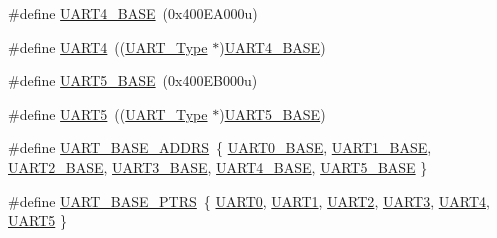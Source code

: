 \begin{DoxyCompactItemize}
\item 
\#define \mbox{\hyperlink{group___u_a_r_t___register___masks_ga94d92270bf587ccdc3a37a5bb5d20467}{U\+A\+R\+T4\+\_\+\+B\+A\+SE}}~(0x400\+E\+A000u)
\item 
\#define \mbox{\hyperlink{group___u_a_r_t___register___masks_ga7c035f6f443c999fc043b2b7fb598800}{U\+A\+R\+T4}}~((\mbox{\hyperlink{struct_u_a_r_t___type}{U\+A\+R\+T\+\_\+\+Type}} $\ast$)\mbox{\hyperlink{group___u_a_r_t___register___masks_ga94d92270bf587ccdc3a37a5bb5d20467}{U\+A\+R\+T4\+\_\+\+B\+A\+SE}})
\item 
\#define \mbox{\hyperlink{group___u_a_r_t___register___masks_gaa155689c0e206e6994951dc3cf31052a}{U\+A\+R\+T5\+\_\+\+B\+A\+SE}}~(0x400\+E\+B000u)
\item 
\#define \mbox{\hyperlink{group___u_a_r_t___register___masks_ga9274e37cf5e8a174fc5dd627b98ec0fe}{U\+A\+R\+T5}}~((\mbox{\hyperlink{struct_u_a_r_t___type}{U\+A\+R\+T\+\_\+\+Type}} $\ast$)\mbox{\hyperlink{group___u_a_r_t___register___masks_gaa155689c0e206e6994951dc3cf31052a}{U\+A\+R\+T5\+\_\+\+B\+A\+SE}})
\item 
\#define \mbox{\hyperlink{group___u_a_r_t___register___masks_gacc6561447356c229be264fa294e6cb79}{U\+A\+R\+T\+\_\+\+B\+A\+S\+E\+\_\+\+A\+D\+D\+RS}}~\{ \mbox{\hyperlink{group___u_a_r_t___register___masks_ga7a07348b4332ff6b88abf6092347deba}{U\+A\+R\+T0\+\_\+\+B\+A\+SE}}, \mbox{\hyperlink{group___u_a_r_t___register___masks_ga383bf0c4670c3a7fa72df80f66331a46}{U\+A\+R\+T1\+\_\+\+B\+A\+SE}}, \mbox{\hyperlink{group___u_a_r_t___register___masks_gac9998d643534960b684d45a60b998421}{U\+A\+R\+T2\+\_\+\+B\+A\+SE}}, \mbox{\hyperlink{group___u_a_r_t___register___masks_ga2eff3896840fdf741bd67d2d7fe99a34}{U\+A\+R\+T3\+\_\+\+B\+A\+SE}}, \mbox{\hyperlink{group___u_a_r_t___register___masks_ga94d92270bf587ccdc3a37a5bb5d20467}{U\+A\+R\+T4\+\_\+\+B\+A\+SE}}, \mbox{\hyperlink{group___u_a_r_t___register___masks_gaa155689c0e206e6994951dc3cf31052a}{U\+A\+R\+T5\+\_\+\+B\+A\+SE}} \}
\item 
\#define \mbox{\hyperlink{group___u_a_r_t___register___masks_ga7b34a38b9492a1e1007b2f66383aef17}{U\+A\+R\+T\+\_\+\+B\+A\+S\+E\+\_\+\+P\+T\+RS}}~\{ \mbox{\hyperlink{group___u_a_r_t___register___masks_ga0508661f121639ffdee7de2353a0def2}{U\+A\+R\+T0}}, \mbox{\hyperlink{group___u_a_r_t___register___masks_ga8d69bf04d07af4fbbab5a8bd291f65ff}{U\+A\+R\+T1}}, \mbox{\hyperlink{group___u_a_r_t___register___masks_ga7f6bd6eb89ae2eeae97af4207ebe3cde}{U\+A\+R\+T2}}, \mbox{\hyperlink{group___u_a_r_t___register___masks_ga961726a611b38bcaf61f3d598b0a59ec}{U\+A\+R\+T3}}, \mbox{\hyperlink{group___u_a_r_t___register___masks_ga7c035f6f443c999fc043b2b7fb598800}{U\+A\+R\+T4}}, \mbox{\hyperlink{group___u_a_r_t___register___masks_ga9274e37cf5e8a174fc5dd627b98ec0fe}{U\+A\+R\+T5}} \}

\end{DoxyCompactItemize}
